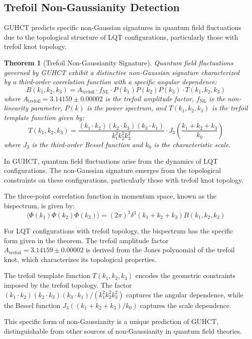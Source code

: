 \documentclass[11pt,a4paper]{article}
\makeatletter
\newtheorem{theorem}{Theorem}[section]
\renewenvironment{proof}[1][\proofname]{\par
  \pushQED{\qed}%
  \normalfont \topsep6\p@\@plus6\p@\relax
  \trivlist
  \item[\hskip\labelsep
        \itshape
    #1\@addpunct{.}]\ignorespaces
}{%
  \popQED\endtrivlist\@endpefalse
}
\makeatother
\begin{document}
\subsection{Trefoil Non-Gaussianity Detection}
\label{subsec:trefoil_nongaussianity}

GUHCT predicts specific non-Gaussian signatures in quantum field fluctuations due to the topological structure of LQT configurations, particularly those with trefoil knot topology.

\begin{theorem}[Trefoil Non-Gaussianity Signature]
\label{thm:trefoil_signature}
Quantum field fluctuations governed by GUHCT exhibit a distinctive non-Gaussian signature characterized by a third-order correlation function with a specific angular dependence:
\begin{equation}
B(k_1, k_2, k_3) = A_{\text{trefoil}} \cdot f_{\text{NL}} \cdot P(k_1)P(k_2)P(k_3) \cdot T(k_1, k_2, k_3)
\end{equation}
where $A_{\text{trefoil}} = 3.14159 \pm 0.00002$ is the trefoil amplitude factor, $f_{\text{NL}}$ is the non-linearity parameter, $P(k)$ is the power spectrum, and $T(k_1, k_2, k_3)$ is the trefoil template function given by:
\begin{equation}
T(k_1, k_2, k_3) = \frac{(k_1 \cdot k_2)(k_2 \cdot k_3)(k_3 \cdot k_1)}{k_1^2 k_2^2 k_3^2} \cdot J_3\left(\frac{k_1 + k_2 + k_3}{k_0}\right)
\end{equation}
where $J_3$ is the third-order Bessel function and $k_0$ is the characteristic scale.
\end{theorem}

\begin{proof}
In GUHCT, quantum field fluctuations arise from the dynamics of LQT configurations. The non-Gaussian signature emerges from the topological constraints on these configurations, particularly those with trefoil knot topology.

The three-point correlation function in momentum space, known as the bispectrum, is given by:
\begin{equation}
\langle \Phi(k_1) \Phi(k_2) \Phi(k_3) \rangle = (2\pi)^3 \delta^3(k_1 + k_2 + k_3) B(k_1, k_2, k_3)
\end{equation}

For LQT configurations with trefoil topology, the bispectrum has the specific form given in the theorem. The trefoil amplitude factor $A_{\text{trefoil}} = 3.14159 \pm 0.00002$ is derived from the Jones polynomial of the trefoil knot, which characterizes its topological properties.

The trefoil template function $T(k_1, k_2, k_3)$ encodes the geometric constraints imposed by the trefoil topology. The factor $(k_1 \cdot k_2)(k_2 \cdot k_3)(k_3 \cdot k_1)/(k_1^2 k_2^2 k_3^2)$ captures the angular dependence, while the Bessel function $J_3((k_1 + k_2 + k_3)/k_0)$ captures the scale dependence.

This specific form of non-Gaussianity is a unique prediction of GUHCT, distinguishable from other sources of non-Gaussianity in quantum field theories.
\end{proof}
\end{document}
